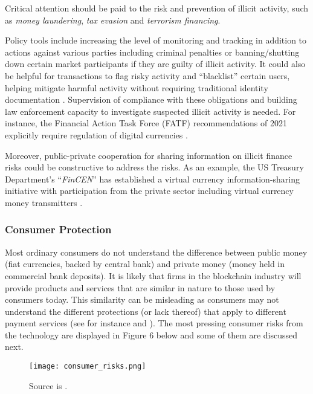 \documentclass[12pt]{article}
\newcommand{\1}{\mathbbm 1}
\begin{document}
	
	Critical attention should be paid to the risk and prevention of illicit activity, such as \textit{money laundering}, \textit{tax evasion} and \textit{terrorism financing}.
	

	
	  Policy tools include increasing the level of monitoring and tracking in addition to actions against various parties including criminal penalties or banning/shutting down certain market participants if they are guilty of illicit activity. It could also be helpful for transactions to flag risky activity and ``blacklist'' certain users, helping mitigate harmful activity without requiring traditional identity documentation \cite{WEF2021governance}. Supervision of compliance with these obligations and building law enforcement capacity to investigate suspected illicit activity is needed. For instance, the Financial Action Task Force (FATF) recommendations of 2021 explicitly require regulation of digital currencies \cite{FATF2021}.
	  
	  	Moreover, public-private cooperation for sharing information on illicit finance risks could be constructive to address the risks. As an example, the US Treasury Department's ``\textit{FinCEN}'' has established a virtual currency information-sharing initiative with participation from the private sector including virtual currency money transmitters \cite{WEF2021governance}.
		
		
		
		\subsubsection{Consumer Protection}
		
		
		
		Most ordinary consumers do not understand the difference between public money (fiat currencies, backed by central bank) and private money (money held in commercial bank deposits). It is likely that firms in the blockchain industry will provide products and services that are similar in nature to those used by consumers today. This similarity can be misleading as consumers may not understand the different protections (or lack thereof) that apply to different payment services (see for instance \cite{WEF2021governance} and \cite{WEF2021regulation}). The most pressing consumer risks from the technology are displayed in Figure 6 below and some of them are discussed next.
		
		
			\begin{figure}[H]
			\begin{Center}
				\texttt{[image: consumer\_risks.png]}		
				\caption{Source is \cite{WEF2021governance}.}
			\end{Center}
		\end{figure}
		
\end{document}
